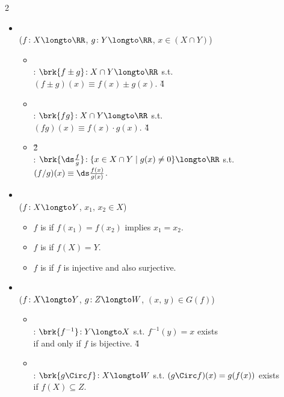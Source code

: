 \documentclass[dvipdfmx,a4paper,titlepage,9pt]{jsarticle}
\begin{document}
\begin{multicols*}{2}
\begin{itemize}[label=-]
\item{} \\
{\small\Gray($f\!:X\longto\RR$, $g\!:Y\longto\RR$, $x\in(X\cap Y)$)}
\begin{itemize}[label={\Cdot}]
\setlength{\leftskip}{-10pt}
\item{} \\
: $\brk{f\pm g}\!:X\cap Y\longto\RR$ s.t. \\
\;\;$(f\pm g)(x)\equiv f(x)\pm g(x)$. \v4
\item{} \\
: $\brk{fg}\!:X\cap Y\longto\RR$ s.t. \\
\;\;$(fg)(x)\equiv f(x)\cdot g(x)$. \v4
\item{} \v2\\
: $\brk{\ds\frac fg}\!: \{x\in X\cap Y\mid g(x)\neq0\}\longto\RR$ s.t. \\
\;\;$(f/g)(x)\equiv\ds\frac{f(x)}{g(x)}$. \\
\end{itemize}

\item{} \\
{\small\Gray($f\!:X\longto Y$, $x_1,\,x_2\in X$)}
\begin{itemize}[label={$\cdot$}]
\setlength{\leftskip}{-10pt}
\item$f$ is  if $f(x_1)=f(x_2)$ implies $x_1=x_2$.
\item$f$ is  if $f(X)=Y$.
\item$f$ is  if $f$ is injective and also surjective. \\
\end{itemize}

\item{} \\
{\small\Gray($f\!:X\longto Y$, $g\!:Z\longto W$, $(x,\,y)\in G(f)$)}
\begin{itemize}[label={\Cdot}]
\setlength{\leftskip}{-10pt}
\item{} \\
: $\brk{f^{-1}}\!:Y\longto X$ s.t. $f^{-1}(y)=x$ exists \\
\;\;if and only if $f$ is bijective. \v4
\item{} \\
: $\brk{g\Circ f}\!:X\longto W$ s.t. $(g\Circ f)(x)=g(f(x))$ exists \\
\;\;if $f(X)\subseteq Z$.
\end{itemize}
\end{itemize}


\end{multicols*}
\end{document}
